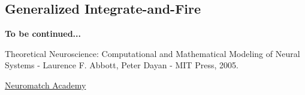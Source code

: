 \documentclass[titlepage]{article}
\begin{document}
\subsection{Generalized Integrate-and-Fire}

\textbf{To be continued...}


\begin{thebibliography}{9}
	
	
	Theoretical Neuroscience: Computational and Mathematical Modeling of Neural Systems - Laurence F. Abbott, Peter Dayan - MIT Press, 2005.
	
	
	\href{https://compneuro.neuromatch.io/tutorials/W2D3_BiologicalNeuronModels/student/W2D3_Tutorial1.html}{Neuromatch Academy}
	
\end{thebibliography}
\end{document}
